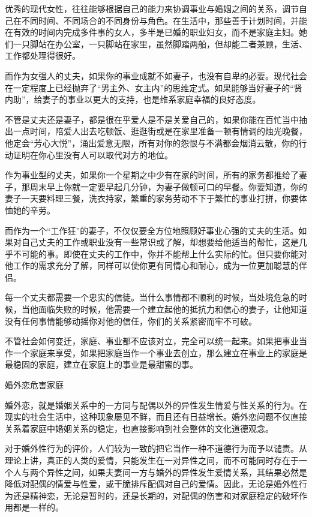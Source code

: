 \documentclass[12pt,UTF8]{ctexbook}
\begin{document}
优秀的现代女性，往往能够根据自己的能力来协调事业与婚姻之间的关系，调节自己在不同时间、不同场合的不同身份与角色。在生活中，那些善于计划时间，并能在有效的时间内完成多件事的女人，多半是已婚的职业妇女，而不是家庭主妇。她们一只脚站在办公室，一只脚站在家里，虽然脚踏两船，但却能二者兼顾，生活、工作都处理得很好。

而作为女强人的丈夫，如果你的事业成就不如妻子，也没有自卑的必要。现代社会在一定程度上已经抛弃了“男主外、女主内”的思维定式。如果能够当好妻子的“贤内助”，给妻子的事业以更大的支持，也是维系家庭幸福的良好态度。

不管是丈夫还是妻子，都是很在乎爱人是不是关爱自己的，如果你能在百忙当中抽出一点时间，陪爱人出去吃顿饭、逛逛街或是在家里准备一顿有情调的烛光晚餐，他定会“芳心大悦”，涌出爱意无限，所有对你的怨恨与不满都会烟消云散，你的行动证明在你心里没有人可以取代对方的地位。

作为事业型的丈夫，如果你一个星期之中少有在家的时间，所有的家务都推给了妻子，那周末早上你就一定要早起几分钟，为妻子做顿可口的早餐。你要知道，你的妻子一天要料理三餐，洗衣持家，繁重的家务劳动不下于繁忙的事业打拼，你要体恤她的辛劳。

而作为一个“工作狂”的妻子，不仅仅要全方位地照顾好事业心强的丈夫的生活。如果对自己丈夫的工作或职业没有一些常识或了解，却想要给他适当的帮忙，这是几乎不可能的事。即使在丈夫的工作中，你并不能帮上什么实际的忙。但只要你能对他工作的需求充分了解，同样可以使你更有同情心和耐心，成为一位更加聪慧的伴侣。

每一个丈夫都需要一个忠实的信徒。当什么事情都不顺利的时候，当处境危急的时候，当他面临失败的时候，他需要一个建立起他的抵抗力和信心的妻子，让他知道没有任何事情能够动摇你对他的信任，你们的关系紧密而牢不可破。

不管社会如何变迁，家庭、事业都不应该对立，完全可以统一起来。如果把事业当作一个家庭来享受，如果把家庭当作一个事业去创立，那么建立在事业上的家庭是最稳固的家庭，建立在家庭上的事业是最甜蜜的事。





婚外恋危害家庭


婚外恋，就是婚姻关系中的一方同与配偶以外的异性发生情爱与性关系的行为。在现实的社会生活中，这种现象屡见不鲜，而且还有日益增长。婚外恋问题不仅直接关系着家庭中婚姻关系的稳定，也直接影响到社会整体的文化道德观念。

对于婚外性行为的评价，人们较为一致的把它当作一种不道德行为而予以谴责。从理论上讲，真正的人类的爱情，只能发生在一对异性之间，而不可能同时存在于一个人与两个异性之间，如果夫妻间一方与婚外的异性发生爱情关系，其结果必然是降低对配偶的情爱与性爱，或干脆排斥配偶对自己的爱情。因此，无论是婚外性行为还是精神恋，无论是暂时的，还是长期的，对配偶的伤害和对家庭稳定的破坏作用都是一样的。
\end{document}
